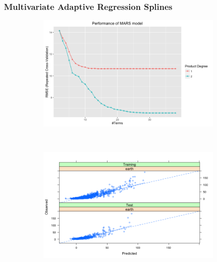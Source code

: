 \documentclass[letterpaper,12pt,titlepage,oneside,final]{report}
\begin{document}
            \subsubsection {Multivariate Adaptive Regression Splines}
                \begin{figure}[!ht]
                \begin{subfigure}[t]{0.45\textwidth}
                    \centering
                    \includegraphics[width=\textwidth]{marsresults}
                    \caption{}
                    \label{marsresults}
                \end{subfigure}%
                    ~ 
                \begin{subfigure}[t]{0.45\textwidth}
                    \centering
                    \includegraphics[width=\textwidth]{mars_pred_obs}
                    \caption{}
                    \label{mars_pred_obs}
                \end{subfigure}
                \end{figure}
\end{document}
